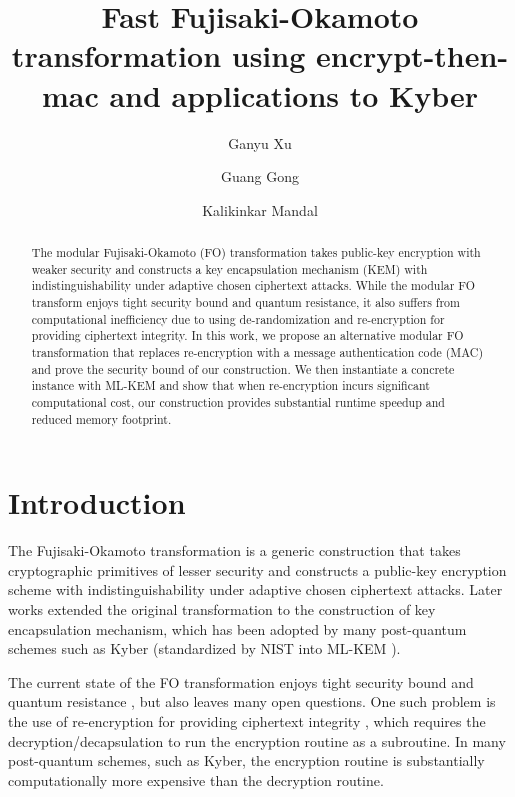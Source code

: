 \documentclass[floatrow,journal=tches,submission]{iacrtrans}
\author{
    Ganyu Xu\inst{1}
    \and Guang Gong\inst{1}
    \and Kalikinkar Mandal\inst{2}
}
\institute{
  University of Waterloo, Waterloo, Canada, \email{{g66xu,ggong}@uwaterloo.ca}
  \and
  University of New Brunswick, New Brunswick, Canada, \email{kmandal@unb.ca}
}
\title{
Fast Fujisaki-Okamoto transformation  using encrypt-then-mac and applications to Kyber}
\begin{document}
\maketitle




\begin{abstract}
  The modular Fujisaki-Okamoto (FO) transformation takes public-key encryption with weaker security and constructs a key encapsulation mechanism (KEM) with indistinguishability under adaptive chosen ciphertext attacks. While the modular FO transform enjoys tight security bound and quantum resistance, it also suffers from computational inefficiency due to using de-randomization and re-encryption for providing ciphertext integrity. In this work, we propose an alternative modular FO transformation that replaces re-encryption with a message authentication code (MAC) and prove the security bound of our construction. We then instantiate a concrete instance with ML-KEM and show that when re-encryption incurs significant computational cost, our construction provides substantial runtime speedup and reduced memory footprint.
\end{abstract}


\section{Introduction}
The Fujisaki-Okamoto transformation \cite{fujisaki1999secure} is a generic construction that takes cryptographic primitives of lesser security and constructs a public-key encryption scheme with indistinguishability under adaptive chosen ciphertext attacks. Later works extended the original transformation to the construction of key encapsulation mechanism, which has been adopted by many post-quantum schemes such as Kyber \cite{bos2018crystals} (standardized by NIST into ML-KEM \cite{key2023mechanism}).

The current state of the FO transformation enjoys tight security bound and quantum resistance \cite{hofheinz2017modular}, but also leaves many open questions. One such problem is the use of re-encryption for providing ciphertext integrity \cite{bernstein2018towards}, which requires the decryption/decapsulation to run the encryption routine as a subroutine. In many post-quantum schemes, such as Kyber, the encryption routine is substantially computationally more expensive than the decryption routine.
\end{document}
